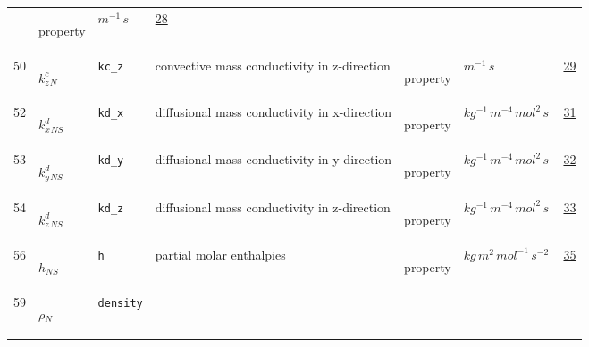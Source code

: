 \begin{longtable}{|p{1cm}|p{2.5cm}|p{4.5cm}|p{8cm}|p{3.0cm}|p{3cm}|p{1cm}|}
             & \begin{lay}property \end{lay}
             & $ m^{-1} \,s \, $
             &                 \hyperlink{"e:28"}{ 28 }
                 \\
            50
             & \hypertarget{"v:50"}{ $ {{k^c_z}}{_{N}} $}
             & \verb|kc_z|
             & convective mass conductivity in z-direction
             & \begin{lay}property \end{lay}
             & $ m^{-1} \,s \, $
             &                 \hyperlink{"e:29"}{ 29 }
                 \\
            52
             & \hypertarget{"v:52"}{ $ {{k^d_x}}{_{{N S}}} $}
             & \verb|kd_x|
             & diffusional mass conductivity in x-direction
             & \begin{lay}property \end{lay}
             & $ kg^{-1} \,m^{-4} \,mol^{2} \,s \, $
             &                 \hyperlink{"e:31"}{ 31 }
                 \\
            53
             & \hypertarget{"v:53"}{ $ {{k^d_y}}{_{{N S}}} $}
             & \verb|kd_y|
             & diffusional mass conductivity in y-direction
             & \begin{lay}property \end{lay}
             & $ kg^{-1} \,m^{-4} \,mol^{2} \,s \, $
             &                 \hyperlink{"e:32"}{ 32 }
                 \\
            54
             & \hypertarget{"v:54"}{ $ {{k^d_z}}{_{{N S}}} $}
             & \verb|kd_z|
             & diffusional mass conductivity in z-direction
             & \begin{lay}property \end{lay}
             & $ kg^{-1} \,m^{-4} \,mol^{2} \,s \, $
             &                 \hyperlink{"e:33"}{ 33 }
                 \\
            56
             & \hypertarget{"v:56"}{ $ {h}{_{{N S}}} $}
             & \verb|h|
             & partial molar enthalpies
             & \begin{lay}property \end{lay}
             & $ kg \,m^{2} \,mol^{-1} \,s^{-2} \, $
             &                 \hyperlink{"e:35"}{ 35 }
                 \\
            59
             & \hypertarget{"v:59"}{ $ {\rho}{_{N}} $}
             & \verb|density|

\end{longtable}
